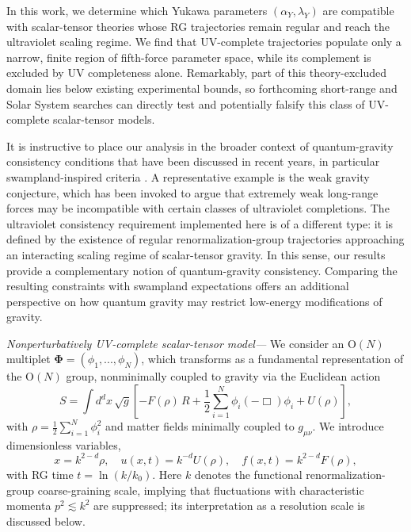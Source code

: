 \documentclass[reprint,superscriptaddress,amsmath,amssymb,aps,prl,floatfix]{revtex4-2}
\def\paragraph#1{
   \textit{#1}
  \unskip
}
\newcommand{\alphay}{\alpha_Y}
\newcommand{\lamy}{\lambda_Y}
\begin{document}
In this work, we determine which Yukawa parameters $(\alphay,\lamy)$ are compatible with scalar-tensor theories whose RG trajectories remain regular and reach the ultraviolet scaling regime. We find that UV-complete trajectories populate only a narrow, finite region of fifth-force parameter space, while its complement is excluded by UV completeness alone. Remarkably, part of this theory-excluded domain lies below existing experimental bounds, so forthcoming short-range and Solar System searches can directly test and potentially falsify this class of UV-complete scalar-tensor models.

It is instructive to place our analysis in the broader context of quantum-gravity consistency conditions that have been discussed in recent years, in particular swampland-inspired criteria \cite{ArkaniHamed:2006dz,Palti:2019pca}. A representative example is the weak gravity conjecture, which has been invoked to argue that extremely weak long-range forces may be incompatible with certain classes of ultraviolet completions. The ultraviolet consistency requirement implemented here is of a different type: it is defined by the existence of regular renormalization-group trajectories approaching an interacting scaling regime of scalar-tensor gravity. In this sense, our results provide a complementary notion of quantum-gravity consistency. Comparing the resulting constraints with swampland expectations offers an additional perspective on how quantum gravity may restrict low-energy modifications of gravity.


\paragraph{Nonperturbatively UV-complete scalar-tensor model—}We consider an O$(N)$ multiplet $\mathbf{\Phi}= (\phi_1,...,\phi_N)$, which transforms as a fundamental representation of the O$(N)$ group, nonminimally coupled to gravity via the Euclidean action
\begin{equation}
S = \int d^d x\,\sqrt{g}\left[
-F(\rho)\,R
+ \frac12 \sum_{i=1}^N\phi_i(-\Box)\phi_i
+ U(\rho)
\right],
\label{eq:action}
\end{equation}
with $\rho = \frac12 \sum_{i=1}^N \phi_i^2$ and matter fields minimally coupled to $g_{\mu\nu}$.
We introduce dimensionless variables,
\begin{equation}
x = k^{2-d}\rho,\quad
u(x,t) = k^{-d} U(\rho),\quad
f(x,t) = k^{2-d} F(\rho),
\end{equation}
with RG time $t = \ln(k/k_0)$.  Here $k$ denotes the functional renormalization-group coarse-graining scale, implying that fluctuations with characteristic momenta $p^2 \lesssim k^2$ are suppressed; its interpretation as a resolution scale is discussed below.
\end{document}
